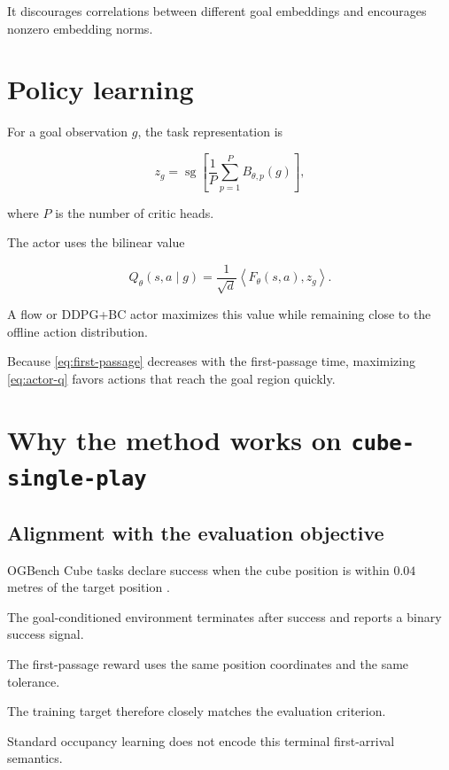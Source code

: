 \documentclass[11pt]{article}
\newcommand{\sg}{\operatorname{sg}}
\newcommand{\inner}[2]{\left\langle #1,#2\right\rangle}
\theoremstyle{remark}
\begin{document}
It discourages correlations between different goal embeddings and encourages nonzero embedding norms.

\section{Policy learning}

For a goal observation $g$, the task representation is

\begin{equation}
z_g=\sg\left[\frac{1}{P}\sum_{p=1}^P B_{\theta,p}(g)\right],
\label{eq:task-vector}
\end{equation}

where $P$ is the number of critic heads.

The actor uses the bilinear value

\begin{equation}
Q_\theta(s,a\mid g)=\frac{1}{\sqrt d}\inner{F_\theta(s,a)}{z_g}.
\label{eq:actor-q}
\end{equation}

A flow or DDPG+BC actor maximizes this value while remaining close to the offline action distribution.

Because \eqref{eq:first-passage} decreases with the first-passage time, maximizing \eqref{eq:actor-q} favors actions that reach the goal region quickly.

\section{Why the method works on \texttt{cube-single-play}}

\subsection{Alignment with the evaluation objective}

OGBench Cube tasks declare success when the cube position is within $0.04$ metres of the target position \citep{park2025ogbench}.

The goal-conditioned environment terminates after success and reports a binary success signal.

The first-passage reward uses the same position coordinates and the same tolerance.

The training target therefore closely matches the evaluation criterion.

Standard occupancy learning does not encode this terminal first-arrival semantics.
\end{document}
